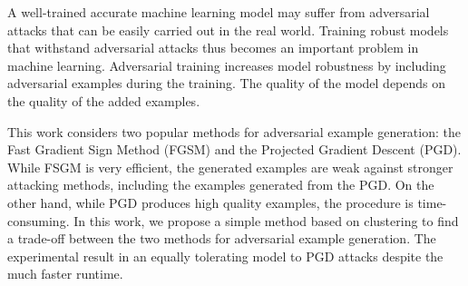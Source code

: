 A well-trained accurate machine learning model may suffer from adversarial attacks that can be easily carried out in the real world. Training robust models that withstand adversarial attacks thus becomes an important problem in machine learning. Adversarial training increases model robustness by including adversarial examples during the training. The quality of the model depends on the quality of the added examples.

This work considers two popular methods for adversarial example generation: the Fast Gradient Sign Method (FGSM) and the Projected Gradient Descent (PGD). While FSGM is very efficient, the generated examples are weak against stronger attacking methods, including the examples generated from the PGD. On the other hand, while PGD produces high quality examples, the procedure is time-consuming. In this work, we propose a simple method based on clustering to find a trade-off between the two methods for adversarial example generation. The experimental result in an equally tolerating model to PGD attacks despite the much faster runtime.
\endgroup
